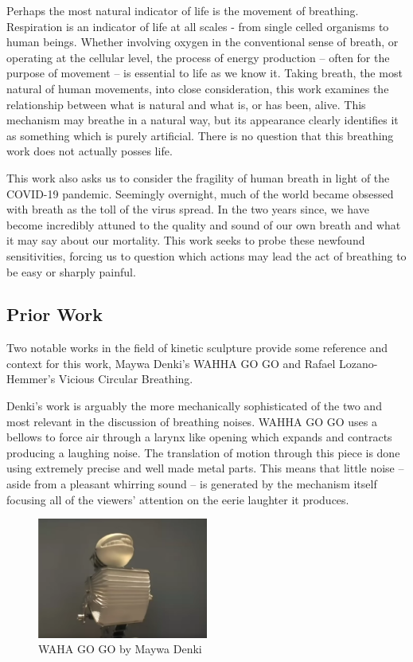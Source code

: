 \documentclass[letterpaper]{article}
\begin{document}
Perhaps the most natural indicator of life is the movement of breathing. Respiration is an indicator of life at all scales - from single celled organisms to human beings. Whether involving oxygen in the conventional sense of breath, or operating at the cellular level, the process of energy production -- often for the purpose of movement -- is essential to life as we know it. Taking breath, the most natural of human movements, into close consideration, this work examines the relationship between what is natural and what is, or has been, alive. This mechanism may breathe in a natural way, but its appearance clearly identifies it as something which is purely artificial. There is no question that this breathing work does not actually posses life.   

This work also asks us to consider the fragility of human breath in light of the COVID-19 pandemic. Seemingly overnight, much of the world became obsessed with breath as the toll of the virus spread. In the two years since, we have become incredibly attuned to the quality and sound of our own breath and what it may say about our mortality. This work seeks to probe these newfound sensitivities, forcing us to question which actions may lead the act of breathing to be easy or sharply painful. 

\subsection{Prior Work}
Two notable works in the field of kinetic sculpture provide some reference and context for this work, Maywa Denki's WAHHA GO GO and Rafael Lozano-Hemmer's Vicious Circular Breathing.\cite{denki}\cite{lozanohemmer} 

Denki's work is arguably the more mechanically sophisticated of the two and most relevant in the discussion of breathing noises. WAHHA GO GO uses a bellows to force air through a larynx like opening which expands and contracts producing a laughing noise. The translation of motion through this piece is done using extremely precise and well made metal parts. This means that little noise -- aside from a pleasant whirring sound -- is generated by the mechanism itself focusing all of the viewers' attention on the eerie laughter it produces.

\begin{figure}[h]
\includegraphics[width=0.5\textwidth]{images/whagogo.png}
\caption{WAHA GO GO by Maywa Denki}
\label{fig:denki}
\end{figure}
\end{document}

